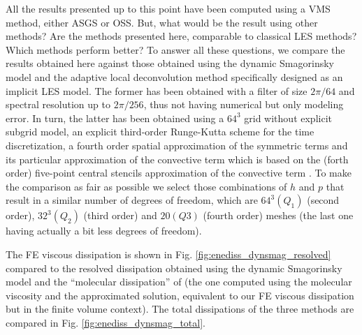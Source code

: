 All the results presented up to this point have been computed using a VMS method, either ASGS or OSS. But, what would be the result using other methods? Are the methods presented here, comparable to classical LES methods? Which methods perform better? To answer all these questions, we compare the results obtained here against those obtained using the dynamic Smagorinsky model \cite{fauconnier_construction_2009} and the adaptive local deconvolution method \cite{hickel_adaptive_2006} specifically designed as an implicit LES model. The former has been obtained with a filter of size $2 \pi / 64$ and spectral resolution up to $2 \pi / 256$, thus not having numerical but only modeling error. In turn, the latter has been obtained using a $64^3$ grid without explicit subgrid model, an explicit third-order Runge-Kutta scheme for the time discretization, a fourth order spatial approximation of the symmetric terms and its particular approximation of the convective term which is based on the (forth order) five-point central stencils approximation of the convective term \cite{hickel_adaptive_2006}. To make the comparison as fair as possible we select those combinations of $h$ and $p$ that result in a similar number of degrees of freedom, which are $64^3 (Q_1)$ (second order), $32^3 (Q_2)$ (third order) and $20 (Q3)$ (fourth order) meshes (the last one having actually a bit less degrees of freedom).

The FE viscous dissipation is shown in Fig. \ref{fig:enediss_dynsmag_resolved} compared to the resolved dissipation obtained using the dynamic Smagorinsky model \cite{fauconnier_construction_2009} and the ``molecular dissipation'' of \cite{hickel_adaptive_2006} (the one computed using the molecular viscosity and the approximated solution, equivalent to our FE viscous dissipation but in the finite volume context). The total dissipations of the three methods are compared in Fig. \ref{fig:enediss_dynsmag_total}. 

